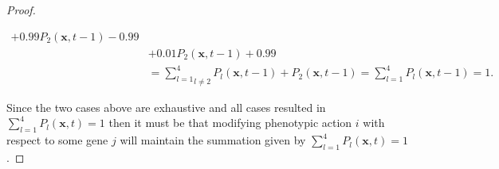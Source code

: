 \documentclass[\main/thesis.tex]{subfiles}
\begin{document}
\begin{proof}
\begin{itemize}
\begin{itemize}
\begin{itemize}
\begin{align*}
                             	                        {+} 0.99 P_2(\boldsymbol{x}, t{-}1) {-} 0.99\\
                             	                       &{+} 0.01 P_2(\boldsymbol{x}, t{-}1) {+} 0.99 \\
                             	                       &{=} \underset{l {\ne} 2}{\sum_{l{=}1}^4} P_l(\boldsymbol{x}, t{-}1)
                             	                        {+} P_2(\boldsymbol{x}, t{-}1)
                             	                        {=} \sum_{l{=}1}^4 P_l(\boldsymbol{x}, t{-}1) {=} 1.
                             	                     \end{align*}
                             \end{itemize}
                           \end{itemize}
	\end{itemize}
    Since the two cases above are exhaustive and all cases resulted in \newline
    $\sum_{l{=}1}^4 P_l(\boldsymbol{x}, t) {=} 1$ then 
    it must be that modifying phenotypic action $i$ with respect to some gene $j$ will 
    maintain the summation given by $\sum_{l{=}1}^4 P_l(\boldsymbol{x}, t) {=} 1$.
\end{proof}
\end{document}
